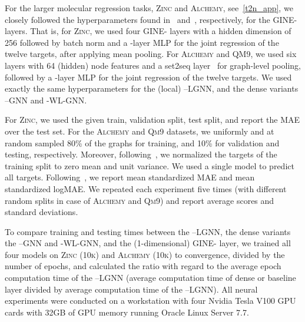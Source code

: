 \documentclass{article}
\theoremstyle{definition}
\newcommand{\gineeps}{\textsf{GINE-}\xspace}
\begin{document}
\begin{description}
	For the larger molecular regression tasks, \textsc{Zinc} and \textsc{Alchemy}, see~\cref{t2n_app}, we closely followed the hyperparameters found in~\cite{Dwi+2020} and~\cite{Che+2020}, respectively, for the \gineeps layers. That is, for \textsc{Zinc}, we used four \gineeps layers with a hidden dimension of 256 followed by batch norm and a -layer MLP for the joint regression of the twelve targets, after applying mean pooling. For \textsc{Alchemy} and \textsc{QM9}, we used six layers with 64 (hidden) node features and a set2seq layer~\cite{Vin+2016} for graph-level pooling, followed by a -layer MLP for the joint regression of the twelve targets. We used exactly the same hyperparameters for the (local) --\textsf{LGNN}, and the dense variants --\textsf{GNN} and -\textsf{WL-GNN}. 
	
	For \textsc{Zinc}, we used the given train, validation split, test split, and report the MAE over the test set. For the \textsc{Alchemy} and \textsc{Qm9} datasets, we uniformly and at random sampled 80\% of the graphs for training, and 10\% for validation and testing, respectively. Moreover, following~\cite{Che+2020,Gil+2017}, we normalized the targets of the training split to zero mean and unit variance. We used a single model to predict all targets. Following~\cite[Appendix C]{Kli+2020}, we report mean standardized MAE and mean standardized logMAE. We repeated each experiment five times (with different random splits in case of \textsc{Alchemy} and \textsc{Qm9}) and report average scores and standard deviations. 
	
	To compare training and testing times between the --\textsf{LGNN}, the dense variants the --\textsf{GNN} and -\textsf{WL-GNN}, and the (1-dimensional) \gineeps layer, we trained all four models on \textsc{Zinc (10k)} and \textsc{Alchemy (10k)} to convergence, divided by the number of epochs, and calculated the ratio with regard to the average epoch computation time of the --\textsf{LGNN} (average computation time of dense or baseline layer divided by average computation time of the --\textsf{LGNN}). All neural experiments were conducted on a workstation with four Nvidia Tesla V100 GPU cards with 32GB of GPU memory running Oracle Linux Server 7.7.
\end{description} 







 
\end{document}
